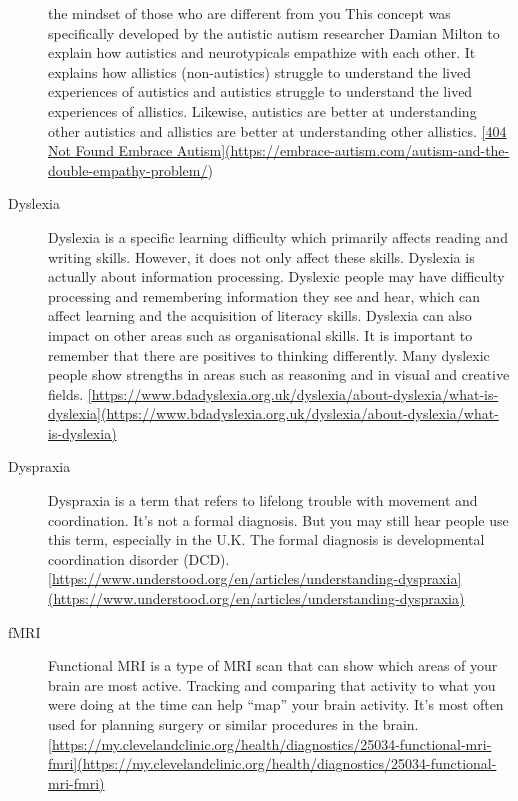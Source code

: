 \documentclass[
  letterpaper,
  DIV=11,
  numbers=noendperiod]{scrreprt}
\begin{document}
\begin{description}
the mindset of those who are different from you This concept was
specifically developed by the autistic autism researcher Damian Milton
to explain how autistics and neurotypicals empathize with each other. It
explains how allistics (non-autistics) struggle to understand the lived
experiences of autistics and autistics struggle to understand the lived
experiences of allistics. Likewise, autistics are better at
understanding other autistics and allistics are better at understanding
other allistics.
\href{https://embrace-autism.com/autism-and-the-double-empathy-problem/}{{[}404
Not Found \textbar{} Embrace
Autism{]}(https://embrace-autism.com/autism-and-the-double-empathy-problem/})
\item[Dyslexia]
Dyslexia is a specific learning difficulty which primarily affects
reading and writing skills. However, it does not only affect these
skills. Dyslexia is actually about information processing. Dyslexic
people may have difficulty processing and remembering information they
see and hear, which can affect learning and the acquisition of literacy
skills. Dyslexia can also impact on other areas such as organisational
skills. It is important to remember that there are positives to thinking
differently. Many dyslexic people show strengths in areas such as
reasoning and in visual and creative fields.
\href{https://www.bdadyslexia.org.uk/dyslexia/about-dyslexia/what-is-dyslexia\%5D(https://www.bdadyslexia.org.uk/dyslexia/about-dyslexia/what-is-dyslexia)}{{[}https://www.bdadyslexia.org.uk/dyslexia/about-dyslexia/what-is-dyslexia{]}(https://www.bdadyslexia.org.uk/dyslexia/about-dyslexia/what-is-dyslexia)}
\item[Dyspraxia]
Dyspraxia is a term that refers to lifelong trouble with movement and
coordination. It's not a formal diagnosis. But you may still hear people
use this term, especially in the U.K. The formal diagnosis is
developmental coordination disorder (DCD).
\href{https://www.understood.org/en/articles/understanding-dyspraxia\%5D(https://www.understood.org/en/articles/understanding-dyspraxia)}{{[}https://www.understood.org/en/articles/understanding-dyspraxia{]}(https://www.understood.org/en/articles/understanding-dyspraxia)}
\item[fMRI]
Functional MRI is a type of MRI scan that can show which areas of your
brain are most active. Tracking and comparing that activity to what you
were doing at the time can help ``map'' your brain activity. It's most
often used for planning surgery or similar procedures in the brain.
\href{https://my.clevelandclinic.org/health/diagnostics/25034-functional-mri-fmri\%5D(https://my.clevelandclinic.org/health/diagnostics/25034-functional-mri-fmri)}{{[}https://my.clevelandclinic.org/health/diagnostics/25034-functional-mri-fmri{]}(https://my.clevelandclinic.org/health/diagnostics/25034-functional-mri-fmri)}

\end{description}
\end{document}
